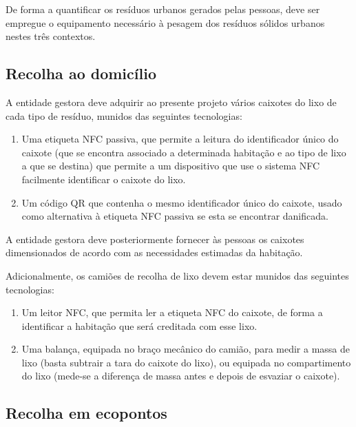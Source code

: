 \documentclass[11pt, a4paper, oneside]{book}
\begin{document}
De forma a quantificar os resíduos urbanos gerados pelas pessoas, deve ser empregue o equipamento necessário à pesagem dos resíduos sólidos urbanos nestes três contextos.

\subsection{Recolha ao domicílio}
A entidade gestora deve adquirir ao presente projeto vários caixotes do lixo de cada tipo de resíduo, munidos das seguintes tecnologias:
\begin{enumerate}
    \itemsep0em
    \item Uma etiqueta NFC passiva, que permite a leitura do identificador único do caixote (que se encontra associado a determinada habitação e ao tipo de lixo a que se destina) que permite a um dispositivo que use o sistema NFC facilmente identificar o caixote do lixo.
    \item Um código QR que contenha o mesmo identificador único do caixote, usado como alternativa à etiqueta NFC passiva se esta se encontrar danificada.
\end{enumerate}

A entidade gestora deve posteriormente fornecer às pessoas os caixotes dimensionados de acordo com as necessidades estimadas da habitação.

Adicionalmente, os camiões de recolha de lixo devem estar munidos das seguintes tecnologias:
\begin{enumerate}
    \itemsep0em
    \item Um leitor NFC, que permita ler a etiqueta NFC do caixote, de forma a identificar a habitação que será creditada com esse lixo.
    \item Uma balança, equipada no braço mecânico do camião, para medir a massa de lixo (basta subtrair a tara do caixote do lixo), ou equipada no compartimento do lixo (mede-se a diferença de massa antes e depois de esvaziar o caixote).
\end{enumerate}

\subsection{Recolha em ecopontos}
\end{document}

